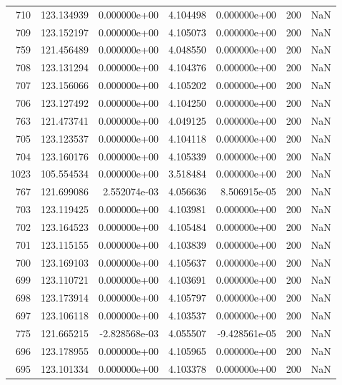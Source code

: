 \begin{tabular}{rrrrrrr}
 710 & 123.134939 &  0.000000e+00 &  4.104498 &  0.000000e+00 &         200 & NaN \\
 709 & 123.152197 &  0.000000e+00 &  4.105073 &  0.000000e+00 &         200 & NaN \\
 759 & 121.456489 &  0.000000e+00 &  4.048550 &  0.000000e+00 &         200 & NaN \\
 708 & 123.131294 &  0.000000e+00 &  4.104376 &  0.000000e+00 &         200 & NaN \\
 707 & 123.156066 &  0.000000e+00 &  4.105202 &  0.000000e+00 &         200 & NaN \\
 706 & 123.127492 &  0.000000e+00 &  4.104250 &  0.000000e+00 &         200 & NaN \\
 763 & 121.473741 &  0.000000e+00 &  4.049125 &  0.000000e+00 &         200 & NaN \\
 705 & 123.123537 &  0.000000e+00 &  4.104118 &  0.000000e+00 &         200 & NaN \\
 704 & 123.160176 &  0.000000e+00 &  4.105339 &  0.000000e+00 &         200 & NaN \\
1023 & 105.554534 &  0.000000e+00 &  3.518484 &  0.000000e+00 &         200 & NaN \\
 767 & 121.699086 &  2.552074e-03 &  4.056636 &  8.506915e-05 &         200 & NaN \\
 703 & 123.119425 &  0.000000e+00 &  4.103981 &  0.000000e+00 &         200 & NaN \\
 702 & 123.164523 &  0.000000e+00 &  4.105484 &  0.000000e+00 &         200 & NaN \\
 701 & 123.115155 &  0.000000e+00 &  4.103839 &  0.000000e+00 &         200 & NaN \\
 700 & 123.169103 &  0.000000e+00 &  4.105637 &  0.000000e+00 &         200 & NaN \\
 699 & 123.110721 &  0.000000e+00 &  4.103691 &  0.000000e+00 &         200 & NaN \\
 698 & 123.173914 &  0.000000e+00 &  4.105797 &  0.000000e+00 &         200 & NaN \\
 697 & 123.106118 &  0.000000e+00 &  4.103537 &  0.000000e+00 &         200 & NaN \\
 775 & 121.665215 & -2.828568e-03 &  4.055507 & -9.428561e-05 &         200 & NaN \\
 696 & 123.178955 &  0.000000e+00 &  4.105965 &  0.000000e+00 &         200 & NaN \\
 695 & 123.101334 &  0.000000e+00 &  4.103378 &  0.000000e+00 &         200 & NaN \\

\end{tabular}

